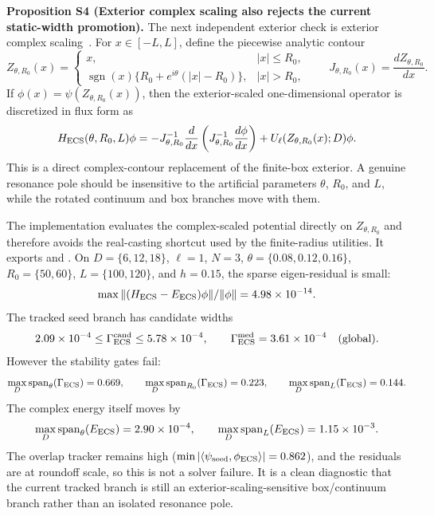 \documentclass[aps,prd,onecolumn,notitlepage,nofootinbib,superscriptaddress,11pt,floatfix]{revtex4-2}
\begin{document}
\medskip\noindent\textbf{Proposition S4 (Exterior complex scaling also rejects the current static-width promotion).}
The next independent exterior check is exterior complex scaling~\cite{AguilarCombes1971,BalslevCombes1971}.  For \(x\in[-L,L]\), define the piecewise analytic contour
\[
Z_{\theta,R_0}(x)=
\begin{cases}
x, & |x|\le R_0,\\
\operatorname{sgn}(x)\{R_0+e^{i\theta}(|x|-R_0)\}, & |x|>R_0,
\end{cases}
\qquad J_{\theta,R_0}(x)=\frac{dZ_{\theta,R_0}}{dx}.
\]
If \(\phi(x)=\psi(Z_{\theta,R_0}(x))\), then the exterior-scaled one-dimensional operator is discretized in flux form as
\[
H_{\rm ECS}(\theta,R_0,L)\phi
=-J_{\theta,R_0}^{-1}\frac{d}{dx}
\left(J_{\theta,R_0}^{-1}\frac{d\phi}{dx}\right)
+U_\ell(Z_{\theta,R_0}(x);D)\phi .
\]
This is a direct complex-contour replacement of the finite-box exterior.  A genuine resonance pole should be insensitive to the artificial parameters \(\theta\), \(R_0\), and \(L\), while the rotated continuum and box branches move with them.

The implementation  evaluates the complex-scaled potential directly on \(Z_{\theta,R_0}\) and therefore avoids the real-casting shortcut used by the finite-radius utilities.  It exports  and .  On \(D=\{6,12,18\}\), \(\ell=1\), \(N=3\), \(\theta=\{0.08,0.12,0.16\}\), \(R_0=\{50,60\}\), \(L=\{100,120\}\), and \(h=0.15\), the sparse eigen-residual is small:
\[
\max \|(H_{\rm ECS}-E_{\rm ECS})\phi\|/\|\phi\|
=4.98\times10^{-14}.
\]
The tracked seed branch has candidate widths
\[
2.09\times10^{-4}\leq \Gamma_{\rm ECS}^{\rm cand}\leq 5.78\times10^{-4},
\qquad
\Gamma_{\rm ECS}^{\rm med}=3.61\times10^{-4}\quad{\rm(global)}.
\]
However the stability gates fail:
\[
\max_D{\rm span}_\theta(\Gamma_{\rm ECS})=0.669,\qquad
\max_D{\rm span}_{R_0}(\Gamma_{\rm ECS})=0.223,\qquad
\max_D{\rm span}_{L}(\Gamma_{\rm ECS})=0.144.
\]
The complex energy itself moves by
\[
\max_D{\rm span}_\theta(E_{\rm ECS})=2.90\times10^{-4},\qquad
\max_D{\rm span}_{L}(E_{\rm ECS})=1.15\times10^{-3}.
\]
The overlap tracker remains high (\(\min|\langle\psi_{\rm seed},\phi_{\rm ECS}\rangle|=0.862\)), and the residuals are at roundoff scale, so this is not a solver failure.  It is a clean diagnostic that the current tracked branch is still an exterior-scaling-sensitive box/continuum branch rather than an isolated resonance pole.
\end{document}
